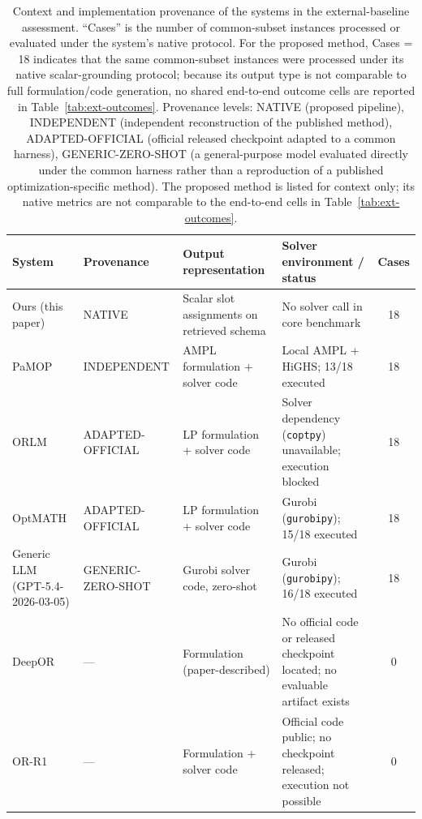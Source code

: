 \documentclass[3p]{elsarticle}
\begin{document}
\begin{table}[t]
  \centering
  \caption{Context and implementation provenance of the systems in the external-baseline assessment. ``Cases'' is the number of common-subset instances processed or evaluated under the system's native protocol. For the proposed method, Cases = 18 indicates that the same common-subset instances were processed under its native scalar-grounding protocol; because its output type is not comparable to full formulation/code generation, no shared end-to-end outcome cells are reported in Table~\ref{tab:ext-outcomes}. Provenance levels: NATIVE (proposed pipeline), INDEPENDENT (independent reconstruction of the published method), ADAPTED-OFFICIAL (official released checkpoint adapted to a common harness), GENERIC-ZERO-SHOT (a general-purpose model evaluated directly under the common harness rather than a reproduction of a published optimization-specific method). The proposed method is listed for context only; its native metrics are not comparable to the end-to-end cells in Table~\ref{tab:ext-outcomes}.}
  \label{tab:ext-context}
  \small
  \setlength{\tabcolsep}{3pt}
  \renewcommand{\arraystretch}{1.15}
  \begin{tabular}{@{}>{\raggedright\arraybackslash}p{1.9cm}>{\raggedright\arraybackslash}p{2.6cm}>{\raggedright\arraybackslash}p{2.5cm}>{\raggedright\arraybackslash}p{3.55cm}c@{}}
    \toprule
    System & Provenance & Output representation & Solver environment / status & Cases \\
    \midrule
    Ours (this paper) & NATIVE & Scalar slot assignments on retrieved schema & No solver call in core benchmark & 18 \\
    PaMOP \cite{pan2025pamop} & INDEPENDENT & AMPL formulation + solver code & Local AMPL + HiGHS; 13/18 executed & 18 \\
    ORLM \cite{huang2025orlm} & ADAPTED- OFFICIAL & LP formulation + solver code & Solver dependency (\texttt{coptpy}) unavailable; execution blocked & 18 \\
    OptMATH \cite{lu2025optmath} & ADAPTED- OFFICIAL & LP formulation + solver code & Gurobi (\texttt{gurobipy}); 15/18 executed & 18 \\
    Generic LLM (GPT-5.4- 2026-03-05) & GENERIC- ZERO-SHOT & Gurobi solver code, zero-shot & Gurobi (\texttt{gurobipy}); 16/18 executed & 18 \\
    DeepOR \cite{xiao2026deepor} & --- & Formulation (paper-described) & No official code or released checkpoint located; no evaluable artifact exists & 0 \\
    OR-R1 \cite{ding2026orr1} & --- & Formulation + solver code & Official code public; no checkpoint released; execution not possible & 0 \\
    \bottomrule
  \end{tabular}
\end{table}
\end{document}
